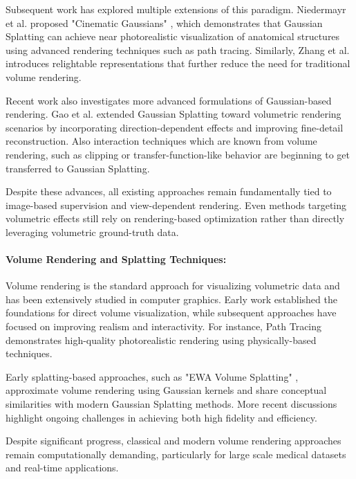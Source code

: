 \documentclass[runningheads]{llncs}
\begin{document}
Subsequent work has explored multiple extensions of this paradigm. Niedermayr et al. proposed "Cinematic Gaussians" \cite{cinematicgaussians2024}, which demonstrates that Gaussian Splatting can achieve near photorealistic visualization of anatomical structures using advanced rendering techniques such as path tracing. Similarly, Zhang et al. \cite{relightablegaussian2024} introduces relightable representations that further reduce the need for traditional volume rendering.

Recent work also investigates more advanced formulations of Gaussian-based rendering. Gao et al. \cite{ddgsct2024,sixdgs2024} extended Gaussian Splatting toward volumetric rendering scenarios by incorporating direction-dependent effects and improving fine-detail reconstruction. Also interaction techniques which are known from volume rendering, such as clipping \cite{raraclipper2025} or transfer-function-like behavior \cite{ivrgs2025} are beginning to get transferred to Gaussian Splatting.

Despite these advances, all existing approaches remain fundamentally tied to image-based supervision and view-dependent rendering. Even methods targeting volumetric effects still rely on rendering-based optimization rather than directly leveraging volumetric ground-truth data.



\paragraph{Volume Rendering and Splatting Techniques:}

Volume rendering is the standard approach for visualizing volumetric data and has been extensively studied in computer graphics. Early work \cite{drebin1988volume} established the foundations for direct volume visualization, while subsequent approaches have focused on improving realism and interactivity. For instance, Path Tracing \cite{kroes2012exposure} demonstrates high-quality photorealistic rendering using physically-based techniques.

Early splatting-based approaches, such as "EWA Volume Splatting" \cite{ewasplatting2001}, approximate volume rendering using Gaussian kernels and share conceptual similarities with modern Gaussian Splatting methods. More recent discussions \cite{cgf2025gs} highlight ongoing challenges in achieving both high fidelity and efficiency.

Despite significant progress, classical and modern volume rendering approaches remain computationally demanding, particularly for large scale medical datasets and real-time applications.
\end{document}
